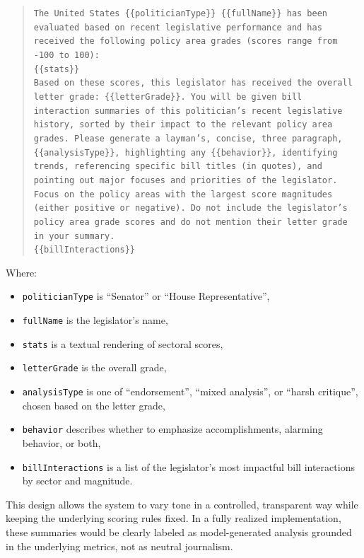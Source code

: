 \documentclass[12pt]{article}
\begin{document}
\begin{quote}
\texttt{The United States \{\{politicianType\}\} \{\{fullName\}\} has been evaluated based on recent legislative performance and has received the following policy area grades (scores range from -100 to 100):}\\

\texttt{\{\{stats\}\}}\\[0.5em]
\texttt{Based on these scores, this legislator has received the overall letter grade: \{\{letterGrade\}\}. You will be given bill interaction summaries of this politician's recent legislative history, sorted by their impact to the relevant policy area grades. Please generate a layman's, concise, three paragraph, \{\{analysisType\}\}, highlighting any \{\{behavior\}\}, identifying trends, referencing specific bill titles (in quotes), and pointing out major focuses and priorities of the legislator. Focus on the policy areas with the largest score magnitudes (either positive or negative). Do not include the legislator's policy area grade scores and do not mention their letter grade in your summary.}\\

\texttt{\{\{billInteractions\}\}}
\end{quote}

Where:

\begin{itemize}
    \item \texttt{politicianType} is ``Senator'' or ``House Representative'',
    \item \texttt{fullName} is the legislator's name,
    \item \texttt{stats} is a textual rendering of sectoral scores,
    \item \texttt{letterGrade} is the overall grade,
    \item \texttt{analysisType} is one of ``endorsement'', ``mixed analysis'', or ``harsh critique'', chosen based on the letter grade,
    \item \texttt{behavior} describes whether to emphasize accomplishments, alarming behavior, or both,
    \item \texttt{billInteractions} is a list of the legislator's most impactful bill interactions by sector and magnitude.
\end{itemize}

This design allows the system to vary tone in a controlled, transparent way while keeping the underlying scoring rules
fixed. In a fully realized implementation, these summaries would be clearly labeled as model-generated analysis grounded
in the underlying metrics, not as neutral journalism.
\end{document}
